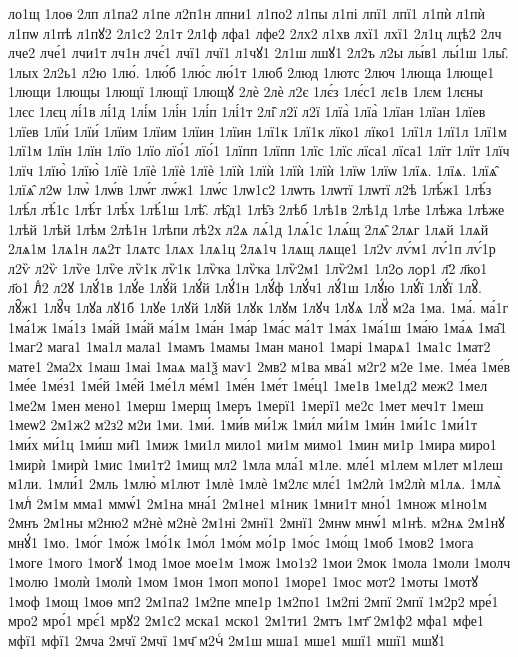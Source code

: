 {ло1щ
1лоѳ
2лп
л1па2
л1пе
л2п1н
лпни1
л1по2
л1пы
л1пі
лпї1
лпї1
л1пѝ
л1пѝ
л1пѡ
л1пѣ
л1пꙋ2
2л1с2
2л1т
2л1ф
лфа1
лфе2
2лх2
л1хв
лхї1
лхї1
2л1ц
лцѣ2
2лч
лче2
лче́1
лчи1т
лч1н
лчє́1
лчї1
лчї1
л1чꙋ1
2л1ш
лшꙋ1
2л2ъ
л2ы
лы́в1
лы́1ш
1лы̑.
1лых
2л2ь1
л2ю
1лю́.
1лю́б
1лю́с
лю́1т
1люб
2люд
1лютс
2люч
1люща
1люще1
1лющи
1лющы
1лющї
1лющї
1лющꙋ
2лѐ
2лѐ
л2є
1лє́з
1лє́с1
лє1в
1лєм
1лєны
1лєс
1лєц
лі́1в
лі́1д
1лі́м
1лі́н
1лі́п
1лі́1т
2лі̑
л2ї
л2ї
1лїа̀
1лїа̀
1лїан
1лїан
1лїев
1лїев
1лїи́
1лїи́
1лїим
1лїим
1лїин
1лїин
1лї1к
1лї1к
лїко1
лїко1
1лї1л
1лї1л
1лї1м
1лї1м
1лїн
1лїн
1лїо
1лїо
лїо́1
лїо́1
1лїпп
1лїпп
1лїс
1лїс
лїса1
лїса1
1лїт
1лїт
1лїч
1лїч
1лїю̀
1лїю̀
1лїѐ
1лїѐ
1лїѐ
1лїѐ
1лїѝ
1лїѝ
1лїѝ
1лїѝ
1лїѡ
1лїѡ
1лїѧ.
1лїѧ.
1лїѧ̑
1лїѧ̑
л2ѡ
1лѡ̀
1лѡ́в
1лѡ́г
лѡ́ж1
1лѡ́с
1лѡ1с2
1лѡть
1лѡтї
1лѡтї
л2ѣ
1лѣ́ж1
1лѣ́з
1лѣ́л
лѣ́1с
1лѣ́т
1лѣ́х
1лѣ́1ш
1лѣ̑.
лѣ̑д1
1лѣ̑з
2лѣб
1лѣ1в
2лѣ1д
1лѣе
1лѣжа
1лѣже
1лѣй
1лѣй
1лѣм
2лѣ1н
1лѣпи
лѣ2х
л2ѧ
лѧ́1д
1лѧ́1с
1лѧ́щ
2лѧ̑
2лѧг
1лѧй
1лѧй
2лѧ1м
1лѧ1н
лѧ2т
1лѧтс
1лѧх
1лѧ1ц
2лѧ1ч
1лѧщ
лѧще1
1л2ѵ
лѵ́м1
лѵ́1п
лѵ́1р
л2ѷ
л2ѷ
1лѷе
1лѷе
лѷ1к
лѷ1к
1лѷка
1лѷка
1лѷ2м1
1лѷ2м1
1л2ѻ
лѻр1
л҃2
л҃ко1
л҃о1
лⷣ2
л2ꙋ
1лꙋ́1в
1лꙋ́е
1лꙋ́й
1лꙋ́й
1лꙋ́1н
1лꙋ́ф
1лꙋ́ч1
лꙋ́1ш
1лꙋ́ю
1лꙋ́ї
1лꙋ́ї
1лꙋ̑.
лꙋ̑ж1
1лꙋ̑ч
1лꙋа
лꙋ1б
1лꙋе
1лꙋй
1лꙋй
1лꙋк
1лꙋм
1лꙋч
1лꙋѧ
1лꙋⷩ
м2а
1ма.
1ма́.
ма́1г
1ма́1ж
1ма́1з
1ма́й
1ма́й
ма́1м
1ма́н
1ма́р
1ма́с
ма́1т
1ма́х
1ма́1ш
1ма́ю
1ма́ѧ
1ма̑1
1маг2
мага1
1ма1л
мала1
1мамъ
1мамы
1ман
мано1
1марі
1марѧ1
1ма1с
1мат2
мате1
2ма2х
1маш
1маі
1маѧ
ма1ѯ
маѵ1
2мв2
м1ва
мва́1
м2г2
м2е
1ме.
1ме́а
1ме́в
1ме́е
1ме́з1
1ме́й
1ме́й
1ме́1л
ме́м1
1ме́н
1ме́т
1ме́ц1
1ме1в
1ме1д2
меж2
1мел
1ме2м
1мен
мено1
1мерш
1мерщ
1меръ
1мерї1
1мерї1
ме2с
1мет
меч1т
1меш
1меѡ2
2м1ж2
м2з2
м2и
1ми.
1ми́.
1ми́в
ми́1ж
1ми́л
ми́1м
1ми́н
1ми́1с
1ми́1т
1ми́х
ми́1ц
1ми́ш
ми̑1
1миж
1ми1л
мило1
ми1м
мимо1
1мин
ми1р
1мира
миро1
1мирѝ
1мирѝ
1мис
1ми1т2
1мищ
мл2
1мла
мла́1
м1ле.
мле́1
м1лем
м1лет
м1леш
м1ли.
1мли́1
2мль
1млю̀
м1лют
1млѐ
1млѐ
1м2лє
млє́1
1м2лѝ
1м2лѝ
м1лѧ.
1млѧ̀
1млⷭ
2м1м
мма1
ммѡ́1
2м1на
мна́1
2м1не1
м1ник
1мни1т
мно́1
1множ
м1но1м
2мнъ
2м1ны
м2ню2
м2нѐ
м2нѐ
2м1ні
2мнї1
2мнї1
2мнѡ
мнѡ́1
м1нѣ.
м2нѧ
2м1нꙋ
мнꙋ́1
1мо.
1мо́г
1мо́ж
1мо́1к
1мо́л
1мо́м
мо́1р
1мо́с
1мо́щ
1моб
1мов2
1мога
1моге
1мого
1могꙋ
1мод
1мое
мое1м
1мож
1мо1з2
1мои
2мок
1мола
1моли
1молч
1молю
1молѝ
1молѝ
1мом
1мон
1моп
мопо1
1море1
1мос
мот2
1моты
1мотꙋ
1моф
1мощ
1моѳ
мп2
2м1па2
1м2пе
мпе1р
1м2по1
1м2пі
2мпї
2мпї
1м2р2
мре́1
мро2
мро́1
мрє́1
мрꙋ2
2м1с2
мска1
мско1
2м1ти1
2мтъ
1мт҃
2м1ф2
мфа1
мфе1
мфї1
мфї1
2мча
2мчї
2мчї
1мч҃
м2чⷭ
2м1ш
мша1
мше1
мшї1
мшї1
мшꙋ1
}
